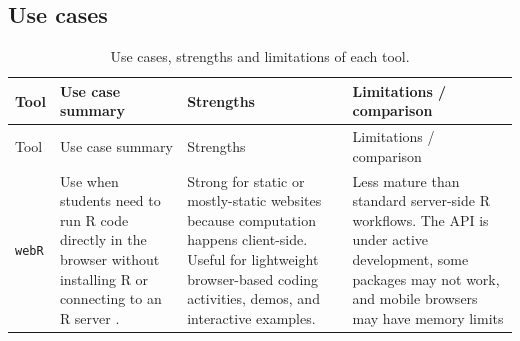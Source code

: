 \documentclass[
  12pt]{article}
\begin{document}
\subsection{Use cases}\label{use-cases}

\begin{longtable}[]{@{}
  >{\raggedright\arraybackslash}p{}
  >{\raggedright\arraybackslash}p{}
  >{\raggedright\arraybackslash}p{}
  >{\raggedright\arraybackslash}p{}@{}}
\caption{Use cases, strengths and limitations of each
tool.}\label{tbl-usecases}\tabularnewline
\toprule\noalign{}
\begin{minipage}[b]{\linewidth}\raggedright
Tool
\end{minipage} & \begin{minipage}[b]{\linewidth}\raggedright
Use case summary
\end{minipage} & \begin{minipage}[b]{\linewidth}\raggedright
Strengths
\end{minipage} & \begin{minipage}[b]{\linewidth}\raggedright
Limitations / comparison
\end{minipage} \\
\midrule\noalign{}
\endfirsthead
\toprule\noalign{}
\begin{minipage}[b]{\linewidth}\raggedright
Tool
\end{minipage} & \begin{minipage}[b]{\linewidth}\raggedright
Use case summary
\end{minipage} & \begin{minipage}[b]{\linewidth}\raggedright
Strengths
\end{minipage} & \begin{minipage}[b]{\linewidth}\raggedright
Limitations / comparison
\end{minipage} \\
\midrule\noalign{}
\endhead
\bottomrule\noalign{}
\endlastfoot
\texttt{webR} & Use when students need to run R code directly in the
browser without installing R or connecting to an R server
\citep{webRdocs}. & Strong for static or mostly-static websites because
computation happens client-side. Useful for lightweight browser-based
coding activities, demos, and interactive examples. & Less mature than
standard server-side R workflows. The API is under active development,
some packages may not work, and mobile browsers may have memory limits

\end{longtable}
\end{document}
